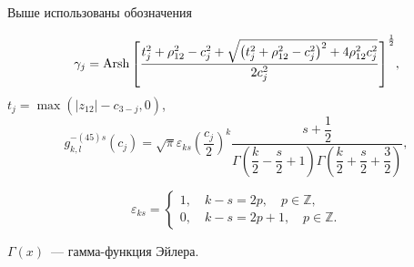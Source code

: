 \begin{theorem}
Выше использованы обозначения

\begin{equation}\label{eq:1:24}
{\gamma _j} = {\rm{Arsh}}{\mkern 1mu} {\kern 1pt} {\left[ {\frac{{t^2_j + \rho _{12}^2 - c_j^2 + \sqrt {\left( {t^2_j + \rho _{12}^2 - c_j^2} \right)^2 + 4\rho _{12}^2c_j^2} }}{{2c_j^2}}} \right]^{\frac{1}{2}}},
\end{equation}
$t_j=\max(|z_{12}|-c_{3-j},0)$,
\begin{equation}\label{eq:1:25}
g_{k,l}^{ - (45)s}({c_j}) = \sqrt \pi  {\varepsilon _{ks}}{\left( {\dfrac{{{c_j}}}{2}} \right)^k}\dfrac{{s + \dfrac{1}{2}}}{{\Gamma \left( {\dfrac{k}{2} - \dfrac{s}{2} + 1} \right)\Gamma \left( {\dfrac{k}{2} + \dfrac{s}{2} + \dfrac{3}{2}} \right)}},
\end{equation}

\begin{equation}\label{eq:1:26}
\varepsilon_{ks}=\left\{ {\begin{array}{*{20}{l}}
{1,\quad k - s = 2p,\quad p \in \mathbb{Z},}\\
{0,\quad k - s = 2p + 1,\quad p \in \mathbb{Z}.}
\end{array}} \right.
\end{equation}

$\Gamma (x)$~--- гамма-функция Эйлера.
\end{theorem}

